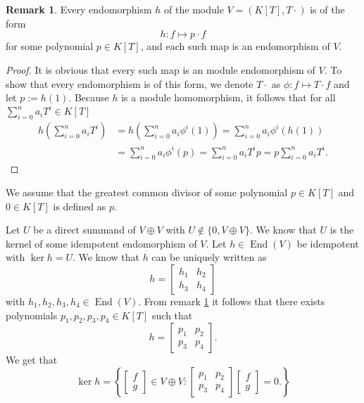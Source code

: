 \documentclass[a4paper,10pt]{article}
\theoremstyle{definition}
\newtheorem{rem}[own]{Remark}
\newcommand{\End}{\operatorname{End}}
\newcommand{\bvect}[1]{\begin{bmatrix}#1\end{bmatrix}}
\begin{document}
\section{}


\subsection{}
\begin{rem}\label{rem: endomorphisms K[T]}
 Every endomorphism $h$ of the module $V = (K[T], T \cdot)$ is of the form
 \[
  h : f \mapsto p \cdot f
 \]
 for some polynomial $p \in K[T]$, and each such map is an endomorphism of $V$.
\end{rem}
\begin{proof}
 It is obvious that every such map is an module endomorphism of $V$. To show that every endomorphism is of this form, we denote $T \cdot$ as $\phi : f \mapsto T \cdot f$ and let $p := h(1)$. Because $h$ is a module homomorphism, it follows that for all $\sum_{i=0}^n a_i T^i \in K[T]$
 \begin{align*}
  h\left( \sum_{i=0}^n a_i T^i \right)
  &= h\left( \sum_{i=0}^n a_i \phi^i(1) \right)
  = \sum_{i=0}^n a_i \phi^i (h(1)) \\
  &= \sum_{i=0}^n a_i \phi^i(p)
  = \sum_{i=0}^n a_i T^i p
  = p \sum_{i=0}^n a_i T^i.
 \end{align*}
\end{proof}

We assume that the greatest common divisor of some polynomial $p \in K[T]$ and $0 \in K[T]$ is defined as $p$.

Let $U$ be a direct summand of $V \oplus V$ with $U \not\in \{0, V \oplus V\}$. We know that $U$ is the kernel of some idempotent endomorphism of $V$. Let $h \in \End(V)$ be idempotent with $\ker h = U$. We know that $h$ can be uniquely written as
\[
 h =
 \begin{bmatrix}
  h_1 & h_2 \\
  h_3 & h_4
 \end{bmatrix}
\]
with $h_1, h_2, h_3, h_4 \in \End(V)$. From remark \ref{rem: endomorphisms K[T]} it follows that there exists polynomials $p_1, p_2, p_3, p_4 \in K[T]$ such that
\[
 h =
 \begin{bmatrix}
  p_1 & p_2 \\
  p_3 & p_4
 \end{bmatrix}.
\]
We get that
\[
 \ker h =
 \left\{ \bvect{f\\g} \in V \oplus V : 
 \begin{bmatrix}
  p_1 & p_2 \\
  p_3 & p_4
 \end{bmatrix}
 \bvect{f\\g}
 = 0.
 \right\}
\]
\end{document}
